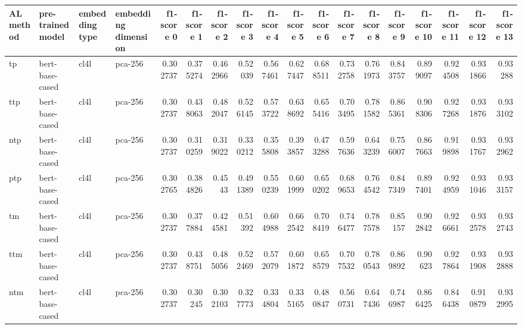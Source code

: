 \begin{tabular}{llllrrrrrrrrrrrrrr}
\hline
 AL method   & pre-trained model   & embedding type   & embedding dimension   &   f1-score 0 &   f1-score 1 &   f1-score 2 &   f1-score 3 &   f1-score 4 &   f1-score 5 &   f1-score 6 &   f1-score 7 &   f1-score 8 &   f1-score 9 &   f1-score 10 &   f1-score 11 &   f1-score 12 &   f1-score 13 \\
\hline
 tp          & bert-base-cased     & cl4l             & pca-256               &     0.302737 &     0.375274 &     0.462966 &     0.52039  &     0.567461 &     0.627447 &     0.688511 &     0.732758 &     0.761973 &     0.843757 &      0.899097 &      0.924508 &      0.931866 &      0.93288  \\
 ttp         & bert-base-cased     & cl4l             & pca-256               &     0.302737 &     0.438063 &     0.482047 &     0.526145 &     0.573722 &     0.638692 &     0.655416 &     0.703495 &     0.781582 &     0.865361 &      0.908306 &      0.927268 &      0.931876 &      0.933102 \\
 ntp         & bert-base-cased     & cl4l             & pca-256               &     0.302737 &     0.310259 &     0.319022 &     0.330212 &     0.355808 &     0.393857 &     0.473288 &     0.597636 &     0.643239 &     0.756007 &      0.867663 &      0.919898 &      0.931767 &      0.932962 \\
 ptp         & bert-base-cased     & cl4l             & pca-256               &     0.302765 &     0.384826 &     0.4543   &     0.491389 &     0.550239 &     0.601999 &     0.650202 &     0.689653 &     0.764542 &     0.847349 &      0.897401 &      0.924959 &      0.931046 &      0.933157 \\
 tm          & bert-base-cased     & cl4l             & pca-256               &     0.302737 &     0.377884 &     0.424581 &     0.51392  &     0.604988 &     0.662542 &     0.708419 &     0.746477 &     0.787578 &     0.85157  &      0.902842 &      0.926661 &      0.932578 &      0.932743 \\
 ttm         & bert-base-cased     & cl4l             & pca-256               &     0.302737 &     0.438751 &     0.485056 &     0.522469 &     0.572079 &     0.601872 &     0.658579 &     0.707532 &     0.780543 &     0.869892 &      0.90623  &      0.927864 &      0.931908 &      0.932888 \\
 ntm         & bert-base-cased     & cl4l             & pca-256               &     0.302737 &     0.30245  &     0.302103 &     0.327773 &     0.334804 &     0.335165 &     0.480847 &     0.560731 &     0.647436 &     0.746987 &      0.866425 &      0.846438 &      0.910879 &      0.932995 \\

\end{tabular}
